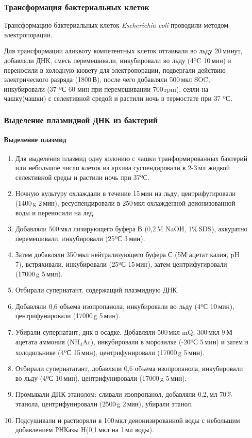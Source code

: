 \subsubsection{Трансформация бактериальных клеток}
\label{subsec:bac_tranform}

Трансформацию бактериальных клеток \emph{Escherichia coli} проводили методом электропорации.

Для трансформации аликвоту компетентных клеток оттаивали во льду 20\,минут, добавляли ДНК, смесь перемешивали, инкубировали во льду (4ºC 10\,мин) и переносили в холодную кювету для электропорации, подвергали действию электрического разряда (1800\,В), после чего добавляли 500\,мкл SOC, инкубировали (37 ºС 60 мин при перемешивании 700\,rpm), сеяли на чашку(чашки) с селективной средой и растили ночь в термостате при 37 ºС.

\subsubsection{Выделение плазмидной ДНК из бактерий}
\paragraph{Выделение плазмид}
\label{subsec:bac_plasm_pur}
\begin{enumerate}[nolistsep]
	\item Для выделения плазмид одну колонию с чашки транформированных бактерий или небольшое число клеток из архива суспендировали в 2-3\,мл жидкой селективной среды и растили ночь при 37ºС.
	\item Ночную культуру охлаждали  в  течение  15\,мин  на  льду, центрифугировали (1400\,g 2\,мин), ресуспендировали в 250\,мкл охлажденной деионизованной воды и переносили на лед. 
	\item Добавляли 500\,мкл лизирующего буфера В (0,2\,M NaOH, 1\%\,SDS), аккуратно перемешивали, инкубировали (25ºС 3\,мин).
	\item Затем добавляли 350\,мкл нейтрализующего буфера С (5М ацетат калия, pH 7), встряхивали,  инкубировали (25ºС 15\,мин), затем центрифугировали (17000\,g 5\,мин). 
	\item Отбирали супернатант, содержащий плазмидную ДНК. 
	\item Добавляли 0,6 объема изопропанола, инкубировали во льду (4ºС 10\,мин), центрифунировали (17000\,g 5\,мин).
	\item Убирали супернатант, днк в осадке. Добавляли 500\,мкл mQ, 300\,мкл 9\,М ацетата аммония (NH\textsubscript{4}Ac), инкубировали в морозилке (-20ºС 5\,мин) и затем в холодильнике (4ºС 15\,мин), центрифунировали (17000\,g 5\,мин).
	\item Отбирали супернататант, добавляли 0,6 объема изопропанола, инкубировали во льду (4ºС 10\,мин), центрифунировали (17000\,g 5\,мин).
	\item Промывали ДНК этанолом: сливали изопропанол, добавляли 0,2,\,мл 70\%\,этанола, центрифунировали (2500\,g 2\,мин), убирали этанол.
	\item Подсушивали и растворяли в 100\,мкл деионизированной воды с небольшим добавлением РНКазы H(0,1\,мкл на 1\,мл воды).

	\end{enumerate}
	
